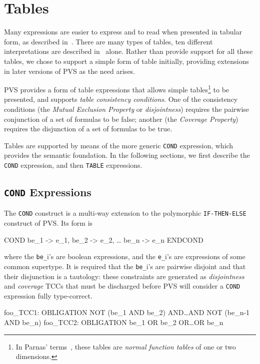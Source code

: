 
\section{Tables}

Many expressions are easier to express and to read when presented in
tabular form, as described in~\cite{Heitmeyer94:SCR-checks,Parnas92}.
There are many types of tables, ten different interpretations are
described in~\cite{Parnas92} alone.  Rather than provide support for all
these tables, we chose to support a simple form of table initially,
providing extensions in later versions of PVS as the need arises.

PVS provides a form of table expressions that allows simple
tables\footnote{In Parnas' terms~\cite{Parnas92}, these tables are
\emph{normal function tables} of one or two dimensions.} to be presented,
and supports \emph{table consistency conditions}.
One of the consistency conditions (the \emph{Mutual Exclusion
Property} or
\emph{disjointness}) requires the pairwise
conjunction of a set of formulas to be false; another (the \emph{Coverage
Property}) requires the disjunction of a set of
formulas to be true.

Tables are supported by means of the more generic \texttt{COND}
expression, which provides the semantic foundation.  In the following
sections, we first describe the \texttt{COND} expression, and then
\texttt{TABLE} expressions.

\subsection{\texttt{COND} Expressions}

The \texttt{COND} construct is a multi-way extension to the polymorphic
\texttt{IF-THEN-ELSE} construct of PVS\@.  Its form is
\begin{pvsex}
  COND
      be\_1 -> e\_1,
      be\_2 -> e\_2,
        \ldots
      be\_n -> e\_n
  ENDCOND
\end{pvsex}
where the \texttt{be\_}i's are boolean expressions, and the \texttt{e\_}i's are
expressions of some common supertype.  It is required that the \texttt{be\_}i's are pairwise disjoint and that their disjunction is a tautology:
these constraints are generated as \emph{disjointness} and \emph{coverage} TCCs that must be discharged before PVS will
consider a \texttt{COND} expression fully type-correct.
\begin{pvsex}
  foo_TCC1: OBLIGATION NOT (be\_1 AND be\_2) AND\ldots{}AND NOT (be\_n-1 AND be\_n)
  foo_TCC2: OBLIGATION be\_1 OR be\_2 OR\ldots{}OR be\_n
\end{pvsex}

